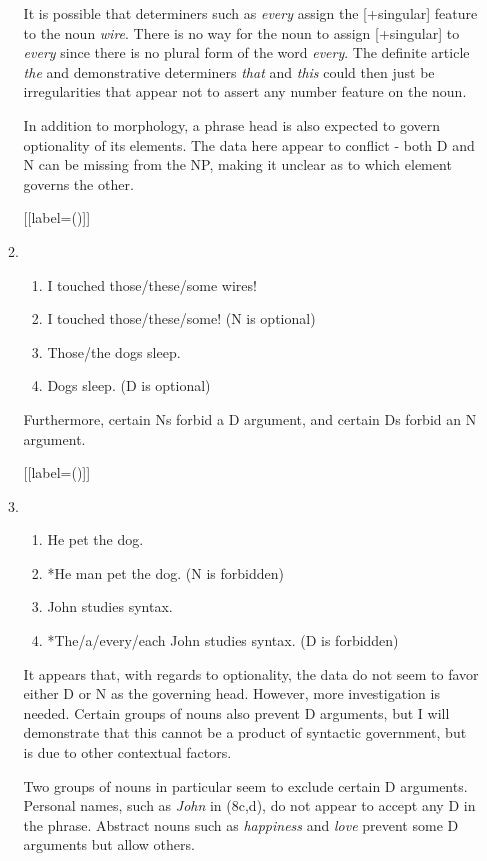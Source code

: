 \documentclass[12pt]{article}
\begin{document}
\begin{enumerate}[label=\textbf{\arabic*.}]
\begin{enumerate}[label=(\arabic*)]
It is possible that determiners such as \emph{every} assign the [+singular] feature to the noun \emph{wire}. There is no way for the noun to assign [+singular] to \emph{every} since there is no plural form of the word \emph{every}. The definite article \emph{the} and demonstrative determiners \emph{that} and \emph{this} could then just be irregularities that appear not to assert any number feature on the noun.

In addition to morphology, a phrase head is also expected to govern optionality of its elements. The data here appear to conflict - both D and N can be missing from the NP, making it unclear as to which element governs the other.

[{[label=(\arabic*)]}]
\item
\begin{enumerate}[label=\alph*.]
\item I touched those/these/some wires!
\item I touched those/these/some! (N is optional)
\item Those/the dogs sleep.
\item Dogs sleep. (D is optional)
\end{enumerate}

Furthermore, certain Ns forbid a D argument, and certain Ds forbid an N argument.

[{[label=(\arabic*)]}]
\item
\begin{enumerate}[label=\alph*.]
\item He pet the dog.
\item *He man pet the dog. (N is forbidden)
\item John studies syntax.
\item *The/a/every/each John studies syntax. (D is forbidden)
\end{enumerate}

It appears that, with regards to optionality, the data do not seem to favor either D or N as the governing head. However, more investigation is needed. Certain groups of nouns also prevent D arguments, but I will demonstrate that this cannot be a product of syntactic government, but is due to other contextual factors.

Two groups of nouns in particular seem to exclude certain D arguments. Personal names, such as \emph{John} in (8c,d), do not appear to accept any D in the phrase. Abstract nouns such as \emph{happiness} and \emph{love} prevent some D arguments but allow others.


\end{enumerate}
\end{enumerate}
\end{document}
